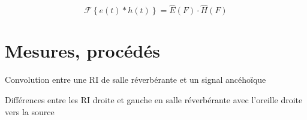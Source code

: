 \documentclass{beamer}
\begin{document}
\begin{frame}

\begin{figure}
\end{figure}

\begin{equation*}
\mathcal{F}\left\{e(t) \ast h(t)\right\} = \hat{E}(F) \cdot \hat{H}(F)
\end{equation*}
\end{frame}

\section{Mesures, procédés}

\begin{frame}
\begin{figure}
\end{figure}
\begin{center}
Convolution entre une RI de salle réverbérante et un signal ancéhoïque
\end{center}
\end{frame}

\begin{frame}
\begin{figure}
\end{figure}
\begin{center}
Différences entre les RI droite et gauche en salle réverbérante avec l'oreille droite vers la source
\end{center}
\end{frame}
\end{document}
